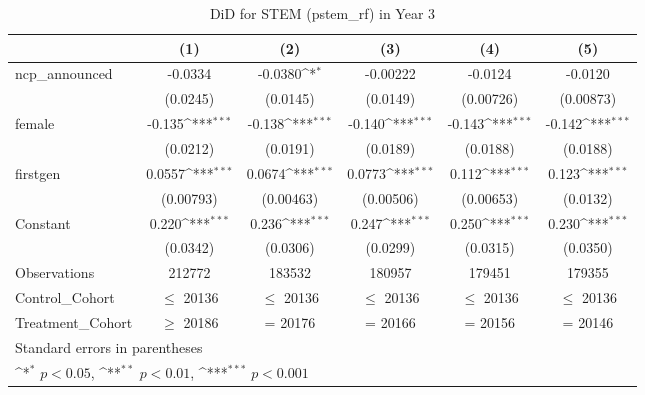 \begin{table}[htbp]\centering
\def\sym#1{\ifmmode^{#1}\else\(^{#1}\)\fi}
\caption{DiD for STEM (pstem\_rf) in Year 3}
\begin{tabular}{l*{5}{c}}
\toprule
                &\multicolumn{1}{c}{(1)}         &\multicolumn{1}{c}{(2)}         &\multicolumn{1}{c}{(3)}         &\multicolumn{1}{c}{(4)}         &\multicolumn{1}{c}{(5)}         \\
\midrule
ncp\_announced   &  -0.0334         &  -0.0380\sym{*}  & -0.00222         &  -0.0124         &  -0.0120         \\
                & (0.0245)         & (0.0145)         & (0.0149)         &(0.00726)         &(0.00873)         \\
\addlinespace
female          &   -0.135\sym{***}&   -0.138\sym{***}&   -0.140\sym{***}&   -0.143\sym{***}&   -0.142\sym{***}\\
                & (0.0212)         & (0.0191)         & (0.0189)         & (0.0188)         & (0.0188)         \\
\addlinespace
firstgen        &   0.0557\sym{***}&   0.0674\sym{***}&   0.0773\sym{***}&    0.112\sym{***}&    0.123\sym{***}\\
                &(0.00793)         &(0.00463)         &(0.00506)         &(0.00653)         & (0.0132)         \\
\addlinespace
Constant        &    0.220\sym{***}&    0.236\sym{***}&    0.247\sym{***}&    0.250\sym{***}&    0.230\sym{***}\\
                & (0.0342)         & (0.0306)         & (0.0299)         & (0.0315)         & (0.0350)         \\
\midrule
Observations    &   212772         &   183532         &   180957         &   179451         &   179355         \\
Control\_Cohort  &$\le$ 20136         &$\le$ 20136         &$\le$ 20136         &$\le$ 20136         &$\le$ 20136         \\
Treatment\_Cohort&$\ge$ 20186         &  = 20176         &  = 20166         &  = 20156         &  = 20146         \\
\bottomrule
\multicolumn{6}{l}{\footnotesize Standard errors in parentheses}\\
\multicolumn{6}{l}{\footnotesize \sym{*} \(p<0.05\), \sym{**} \(p<0.01\), \sym{***} \(p<0.001\)}\\
\end{tabular}
\end{table}
